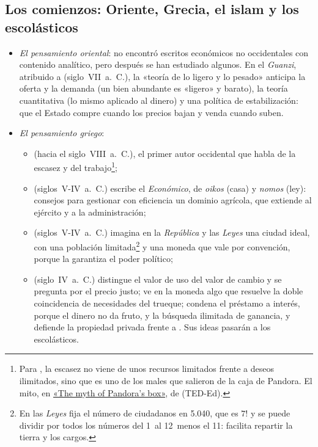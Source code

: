 \documentclass[11pt]{article}
\begin{document}
\subsection{Los comienzos: Oriente, Grecia, el islam y los escolásticos}\label{anexo:comienzos}

\begin{itemize}
\item \emph{El pensamiento oriental}:  no encontró escritos económicos no occidentales con contenido analítico\nocite{Schumpeter1954History}, pero después se han estudiado algunos. En el \emph{Guanzi}, atribuido a  (siglo~VII~a.~C.), la «teoría de lo ligero y lo pesado» anticipa la oferta y la demanda (un bien abundante es «ligero» y barato), la teoría cuantitativa (lo mismo aplicado al dinero) y una política de estabilización: que el Estado compre cuando los precios bajan y venda cuando suben.
\item \emph{El pensamiento griego}:
  \begin{itemize}
  \item {} (hacia el siglo~VIII~a.~C.), el primer autor occidental que habla de la escasez y del trabajo\footnote{Para , la escasez no viene de unos recursos limitados frente a deseos ilimitados, sino que es uno de los males que salieron de la caja de Pandora. El mito, en \href{https://ed.ted.com/lessons/the-myth-of-pandora-s-box-iseult-gillespie}{«The myth of Pandora's box»}, de  (TED-Ed).};
  \item {} (siglos~V-IV~a.~C.) escribe el \emph{Económico}, de \emph{oikos} (casa) y \emph{nomos} (ley): consejos para gestionar con eficiencia un dominio agrícola, que extiende al ejército y a la administración;
  \item {} (siglos~V-IV~a.~C.) imagina en la \emph{República} y las \emph{Leyes} una ciudad ideal, con una población limitada\footnote{En las \emph{Leyes} fija el número de ciudadanos en 5.040, que es $7!$ y se puede dividir por todos los números del 1~al 12~menos el 11: facilita repartir la tierra y los cargos.} y una moneda que vale por convención, porque la garantiza el poder político;
  \item {} (siglo~IV~a.~C.) distingue el valor de uso del valor de cambio y se pregunta por el precio justo; ve en la moneda algo que resuelve la doble coincidencia de necesidades del trueque; condena el préstamo a interés, porque el dinero no da fruto, y la búsqueda ilimitada de ganancia, y defiende la propiedad privada frente a . Sus ideas pasarán a los escolásticos.

\end{itemize}
\end{itemize}
\end{document}

